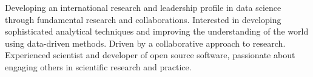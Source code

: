 \vspace{0.25cm}

\begin{cvparagraph}

Developing an international research and leadership profile in data science through fundamental research and collaborations. 
Interested in developing sophisticated analytical techniques and improving the understanding of the world using data-driven methods.
Driven by a collaborative approach to research.
Experienced scientist and developer of open source software, passionate about engaging others in scientific research and practice. 
\end{cvparagraph}